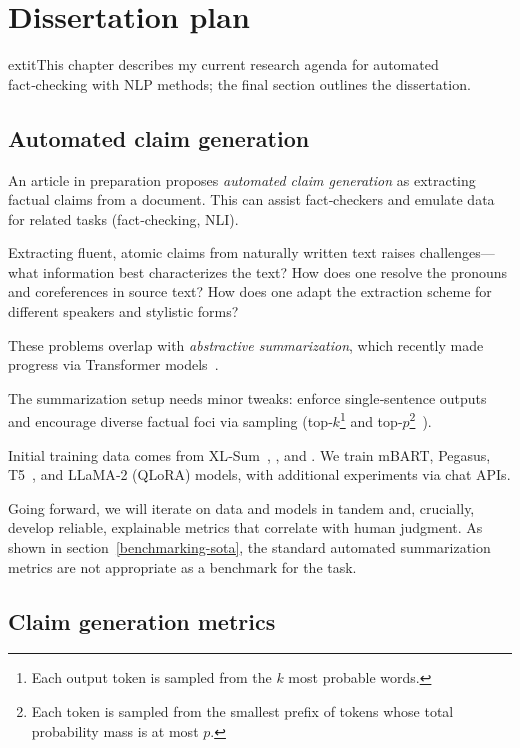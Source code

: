 
\chapter{Dissertation plan}
\label{chap:plan}
	extit{This chapter describes my current research agenda for automated fact‑checking with NLP methods; the final section outlines the dissertation.}

\section{Automated claim generation}
\label{generation}

An article in preparation proposes \textit{automated claim generation} as extracting factual claims from a document. This can assist fact‑checkers and emulate data for related tasks (fact‑checking, NLI).

Extracting fluent, atomic claims from naturally written text raises challenges—what information best characterizes the text? 
How does one resolve the pronouns and coreferences in source text?
How does one adapt the extraction scheme for different speakers and stylistic forms?

These problems overlap with \textit{abstractive summarization}, which recently made progress via Transformer models~\cite{pegasus,brio}.

The summarization setup needs minor tweaks: enforce single‑sentence outputs and encourage diverse factual foci via sampling (top‑$k$\footnote{Each output token is sampled from the $k$ most probable words.} and top‑$p$\footnote{Each token is sampled from the smallest prefix of tokens whose total probability mass is at most $p$.}~\cite{topp}).

Initial training data comes from XL‑Sum~\cite{xlsum}, \FEN, and \CTK. We train mBART, Pegasus, T5~\cite{t5-11b}, and LLaMA‑2 (QLoRA) models, with additional experiments via chat APIs.

Going forward, we will iterate on data and models in tandem and, crucially, develop reliable, explainable metrics that correlate with human judgment.
As shown in section~\ref{benchmarking-sota}, the standard automated summarization metrics are not appropriate as a benchmark for the task.

\section{Claim generation metrics}
\label{metrics}

